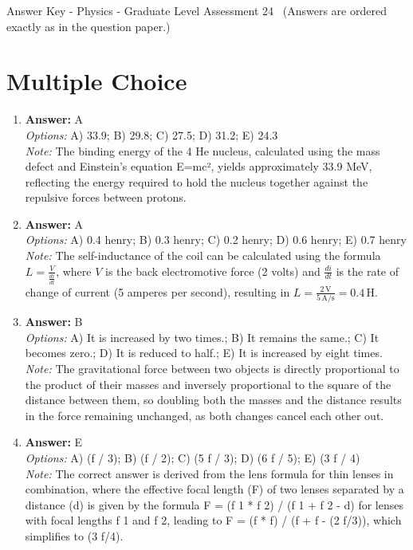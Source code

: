 \documentclass[12pt]{article}
\begin{document}
\begin{center}
Answer Key - Physics - Graduate Level Assessment 24 \
\small (Answers are ordered exactly as in the question paper.)
\end{center}

\section*{Multiple Choice}
\begin{enumerate}[label=\arabic*.]
\item \textbf{Answer:} A
\\ \textit{Options:} A) 33.9; B) 29.8; C) 27.5; D) 31.2; E) 24.3
\\ \textit{Note:} The binding energy of the 4 He nucleus, calculated using the mass defect and Einstein's equation E=mc², yields approximately 33.9 MeV, reflecting the energy required to hold the nucleus together against the repulsive forces between protons.
\item \textbf{Answer:} A
\\ \textit{Options:} A) 0.4 henry; B) 0.3 henry; C) 0.2 henry; D) 0.6 henry; E) 0.7 henry
\\ \textit{Note:} The self-inductance of the coil can be calculated using the formula \( L = \frac{V}{\frac{di}{dt}} \), where \( V \) is the back electromotive force (2 volts) and \( \frac{di}{dt} \) is the rate of change of current (5 amperes per second), resulting in \( L = \frac{2 \, \text{V}}{5 \, \text{A/s}} = 0.4 \, \text{H} \).
\item \textbf{Answer:} B
\\ \textit{Options:} A) It is increased by two times.; B) It remains the same.; C) It becomes zero.; D) It is reduced to half.; E) It is increased by eight times.
\\ \textit{Note:} The gravitational force between two objects is directly proportional to the product of their masses and inversely proportional to the square of the distance between them, so doubling both the masses and the distance results in the force remaining unchanged, as both changes cancel each other out.
\item \textbf{Answer:} E
\\ \textit{Options:} A) (f / 3); B) (f / 2); C) (5 f / 3); D) (6 f / 5); E) (3 f / 4)
\\ \textit{Note:} The correct answer is derived from the lens formula for thin lenses in combination, where the effective focal length (F) of two lenses separated by a distance (d) is given by the formula F = (f 1 * f 2) / (f 1 + f 2 - d) for lenses with focal lengths f 1 and f 2, leading to F = (f * f) / (f + f - (2 f/3)), which simplifies to (3 f/4).

\end{enumerate}
\end{document}
